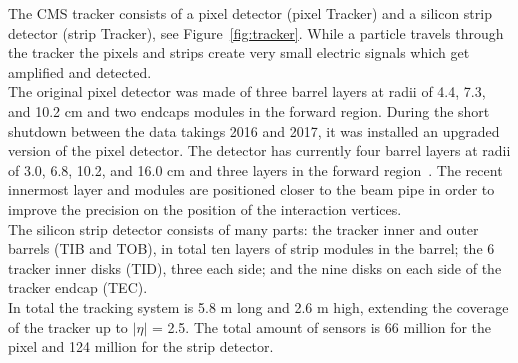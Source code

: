 The CMS tracker consists of a pixel detector (pixel Tracker) and a
silicon strip detector (strip Tracker), see
Figure~\ref{fig:tracker}. While a particle travels through the tracker the pixels and
strips create very small electric signals which get amplified and
detected.\\
The original pixel detector was made of three barrel
layers at radii of 4.4, 7.3, and 10.2 cm and two endcaps modules in
the forward region. 
During the short shutdown between the data takings 2016 and 2017, it
was installed an
upgraded version of the pixel detector. The detector has currently four
barrel layers at radii of 3.0, 6.8, 10.2, and
16.0 cm and three layers in the forward region~\cite{Dominguez:1481838}. The
recent innermost layer and modules
are positioned closer to the beam pipe in order to improve the
precision on the position of the interaction vertices.\\
The silicon strip detector consists of many parts: the tracker inner and
outer barrels (TIB and TOB), in total ten layers of strip modules in
the barrel; the 6 tracker inner disks (TID), three each
side; and the nine disks on each side of the tracker endcap (TEC).\\
In total the tracking system is 5.8 m long and 2.6 m high,
extending the coverage of the tracker up to $|\eta|$ = 2.5. The total
amount of sensors is 66 million for the pixel and 124 million for the
strip detector. 

